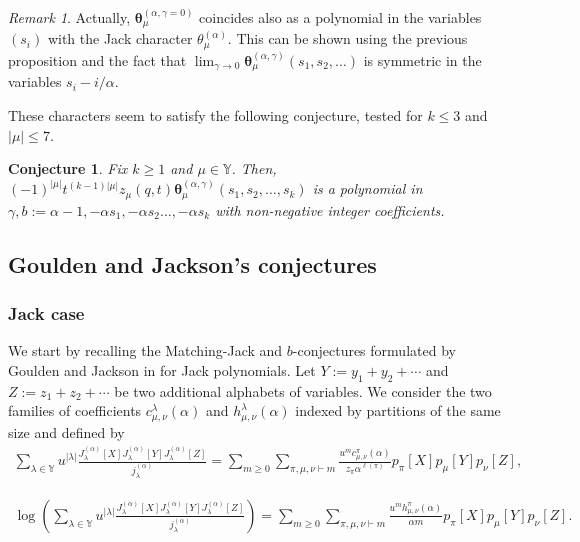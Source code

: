 \documentclass[12pt]{amsart}
\newtheorem{conj}{Conjecture}
\theoremstyle{remark}
\newtheorem{rmq}{Remark}
\newcommand{\MchJack}{{\boldsymbol{\theta}}^{(\alpha,\gamma)}}
\newcommand{\Jla}{J^{(\alpha)}_{\lambda}}
\begin{document}
\begin{rmq}
    Actually, $\boldsymbol{\theta}_\mu^{(\alpha,\gamma=0)}$ coincides also as a polynomial in the variables $(s_i)$ with the Jack character $\theta_\mu^{(\alpha)}$. This can be shown using the previous proposition and the fact that  $\lim_{\gamma \rightarrow 0}\MchJack_\mu(s_1,s_2,\dots)$ is symmetric in the variables $s_i-i/\alpha$.
\end{rmq}

These characters seem to satisfy the following conjecture, tested for $k\leq 3$ and $|\mu|\leq 7$.

\begin{conj}\label{conj lassale macdonald}
Fix $k\geq 1$ and $\mu\in \mathbb{Y}$. Then,
    $(-1)^{|\mu|}t^{(k-1)|\mu|}z_\mu(q,t)\MchJack_\mu(s_1,s_2,\dots, s_k)$ is a polynomial in $\gamma,b:=\alpha-1, -\alpha s_1, -\alpha s_2\dots, -\alpha s_k$ with non-negative integer coefficients.
\end{conj}

\subsection{Goulden and Jackson's conjectures}\label{sec GJ conjectures}

\subsubsection{Jack case}
We start by recalling the Matching-Jack and $b$-conjectures formulated by Goulden and Jackson in \cite{GouldenJackson1996} for Jack polynomials. Let $Y:=y_1+y_2+\cdots $ and $Z:=z_1+z_2+\cdots$ be two additional alphabets of variables.
We consider the two families of coefficients $c^\lambda_{\mu,\nu}(\alpha)$ and $h^\lambda_{\mu,\nu}(\alpha)$ indexed by partitions of the same size and defined by 
\begin{align*}
    \sum_{\lambda\in\mathbb Y} u^{|\lambda|} \frac{\Jla[X]\Jla[Y]\Jla[Z]}{j^{(\alpha)}_\lambda}=\sum_{m\geq 0}\sum_{\pi,\mu,\nu\vdash m} \frac{u^m c^\pi_{\mu,\nu}(\alpha)}{z_\pi \alpha^{\ell(\pi)}}p_\pi[X]p_\mu[Y]p_\nu[Z],
\end{align*}

\begin{align*}
  \log\left(\sum_{\lambda\in\mathbb Y} u^{|\lambda|} \frac{\Jla[X]\Jla[Y]\Jla[Z]}{j^{(\alpha)}_\lambda}\right) 
  =\sum_{m\geq 0}\sum_{\pi,\mu,\nu\vdash m} \frac{u^m h^\pi_{\mu,\nu}(\alpha)}{\alpha m}p_\pi[X]p_\mu[Y]p_\nu[Z].   
\end{align*}
\end{document}
